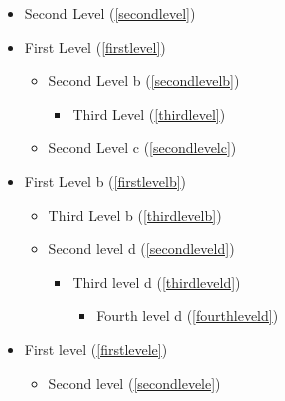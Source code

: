 
\def\mytitle{Table of Contents}


\begin{itemize}

\item{} Second Level (\autoref{secondlevel})

\item{} First Level (\autoref{firstlevel})

\begin{itemize}

\item{} Second Level b (\autoref{secondlevelb})

\begin{itemize}

\item{} Third Level (\autoref{thirdlevel})

\end{itemize}

\item{} Second Level c (\autoref{secondlevelc})

\end{itemize}

\item{} First Level b (\autoref{firstlevelb})

\begin{itemize}

\item{} Third Level b (\autoref{thirdlevelb})

\item{} Second level d (\autoref{secondleveld})

\begin{itemize}

\item{} Third level d (\autoref{thirdleveld})

\begin{itemize}

\item{} Fourth level d (\autoref{fourthleveld})

\end{itemize}

\end{itemize}

\end{itemize}

\item{} First level  (\autoref{firstlevele})

\begin{itemize}

\item{} Second level  (\autoref{secondlevele})

\end{itemize}

\end{itemize}



